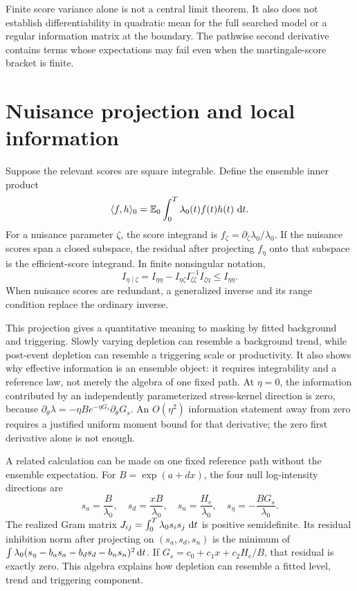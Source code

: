 Finite score variance alone is not a central limit theorem. It also does not establish differentiability in quadratic mean for the full searched model or a regular information matrix at the boundary. The pathwise second derivative contains terms whose expectations may fail even when the martingale-score bracket is finite.

\section{Nuisance projection and local information}

Suppose the relevant scores are square integrable. Define the ensemble inner product
\[
\langle f,h\rangle_0
=
\mathbb{E} _0\int_0^T\lambda_0(t)f(t)h(t)\,\mathop{}\!\mathrm{d} t.
\]
For a nuisance parameter \(\zeta\), the score integrand is
\(f_\zeta=\partial_\zeta\lambda_0/\lambda_0\). If the nuisance scores span a closed subspace, the residual after projecting \(f_\eta\) onto that subspace is the efficient-score integrand. In finite nonsingular notation,
\[
I_{\eta\mid\zeta}
=
I_{\eta\eta}-I_{\eta\zeta}I_{\zeta\zeta}^{-1}I_{\zeta\eta}
\le I_{\eta\eta}.
\]
When nuisance scores are redundant, a generalized inverse and its range condition replace the ordinary inverse.

This projection gives a quantitative meaning to masking by fitted background and triggering. Slowly varying depletion can resemble a background trend, while post-event depletion can resemble a triggering scale or productivity. It also shows why effective information is an ensemble object: it requires integrability and a reference law, not merely the algebra of one fixed path. At \(\eta=0\), the information contributed by an independently parameterized stress-kernel direction is zero, because
\(\partial_\theta\lambda=-\eta B e^{-\eta G_s}\partial_\theta G_s\).
An \(O(\eta^2)\) information statement away from zero requires a justified uniform moment bound for that derivative; the zero first derivative alone is not enough.

A related calculation can be made on one fixed reference path without the ensemble expectation. For \(B=\exp(a+dx)\), the four null log-intensity directions are
\[
s_a=\frac B{\lambda_0},\quad
s_d=\frac{xB}{\lambda_0},\quad
s_n=\frac{H_e}{\lambda_0},\quad
s_\eta=-\frac{BG_s}{\lambda_0}.
\]
The realized Gram matrix \(J_{ij}=\int_0^T\lambda_0s_is_j\,\mathop{}\!\mathrm{d} t\) is positive semidefinite. Its residual inhibition norm after projecting on \((s_a,s_d,s_n)\) is the minimum of
\(\int\lambda_0(s_\eta-b_as_a-b_ds_d-b_ns_n)^2\mathop{}\!\mathrm{d} t\).
If \(G_s=c_0+c_1x+c_2H_e/B\), that residual is exactly zero. This algebra explains how depletion can resemble a fitted level, trend and triggering component.

